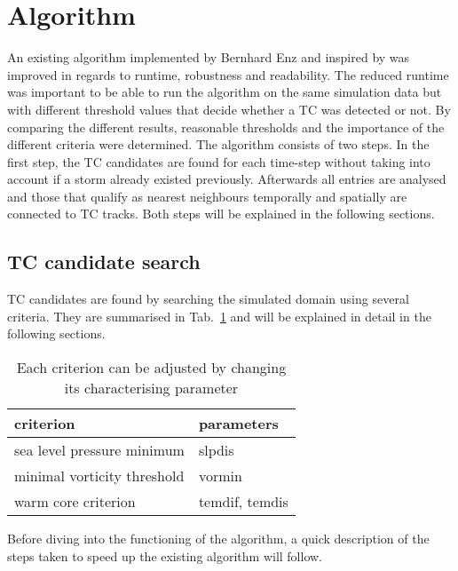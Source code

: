 \section{Algorithm}
An existing algorithm implemented by Bernhard Enz and inspired by \cite{orig-tracking} was improved in regards to runtime, robustness and
readability. The reduced runtime was important to be able to run the algorithm on the
same simulation data but with different threshold values that decide whether a
TC was detected or not. By comparing the different results, reasonable thresholds
and the importance of the different criteria were determined.\newline
The algorithm consists of two steps. In the first step, the TC candidates are
found for each time-step without taking into account if a storm already existed
previously. Afterwards all entries are analysed and those that qualify as nearest neighbours temporally and spatially are connected to TC tracks. Both steps
will be explained in the following sections.
\subsection{TC candidate search}
TC candidates are found by searching the simulated domain using several
criteria. They are summarised in Tab.~\ref{tab:search-algo-summ} and will be
explained in detail in the following sections. 
\begin{table}[h]
	\centering
	\begin{tabular}{|l|l|}
		\hline
		\textbf{criterion}          & \textbf{parameters} \\ \hline
		sea level pressure minimum  & slpdis              \\
		minimal vorticity threshold & vormin              \\
		warm core criterion         & temdif, temdis      \\ \hline
	\end{tabular}
	\caption{Each criterion can be adjusted by changing its characterising
		parameter}
	\label{tab:search-algo-summ}
\end{table}
Before diving into the functioning of the algorithm, a quick description of the steps taken to speed up the existing algorithm will follow.

